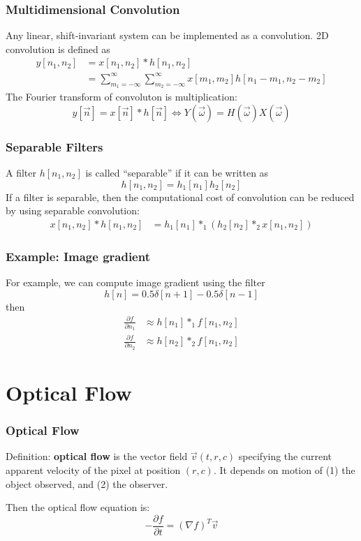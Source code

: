 \documentclass{beamer}
\begin{document}
\begin{frame}
  \frametitle{Multidimensional Convolution}

  Any linear, shift-invariant system can be implemented as a
  convolution.  2D convolution is defined as
  \begin{align*}
    y[n_1,n_2] &= x[n_1,n_2]\ast h[n_1,n_2]\\
    &= \sum_{m_1=-\infty}^\infty\sum_{m_2=-\infty}^\infty x[m_1,m_2]h[n_1-m_1,n_2-m_2]
  \end{align*}
  The Fourier transform of convoluton is multiplication:
  \[
  y[\vec{n}]=x[\vec{n}]\ast h[\vec{n}] \Leftrightarrow Y(\vec\omega)=H(\vec\omega)X(\vec\omega)
  \]
\end{frame}

\begin{frame}
  \frametitle{Separable Filters}
  A filter $h[n_1,n_2]$ is called ``separable'' if it can be written as
  \[
  h[n_1,n_2] = h_1[n_1]h_2[n_2]
  \]
  If a filter is separable, then the computational cost of convolution can be reduced
  by using separable convolution:
  \begin{align*}
    x[n_1,n_2]\ast h[n_1,n_2]
    &= h_1[n_1] \ast_1 \left(h_2[n_2]\ast_2 x[n_1,n_2]\right)
  \end{align*}
  
\end{frame}


\begin{frame}
  \frametitle{Example: Image gradient}

  For example, we can compute image gradient using the filter
  \[
  h[n] = 0.5\delta[n+1] - 0.5\delta[n-1]
  \]
  then
  \begin{align*}
  \frac{\partial f}{\partial n_1} &\approx h[n_1]\ast_1 f[n_1,n_2]\\
  \frac{\partial f}{\partial n_2} &\approx h[n_2]\ast_2 f[n_1,n_2]
  \end{align*}

\end{frame}

\section[Flow]{Optical Flow}
\setcounter{subsection}{1}

\begin{frame}
  \frametitle{Optical Flow}

  Definition: {\bf optical flow} is the vector field $\vec{v}(t,r,c)$
  specifying the current apparent velocity of the pixel at position
  $(r,c)$.  It depends on motion of (1) the object observed, and (2)
  the observer.
  
  Then the optical flow equation is:
  \[
  -\frac{\partial f}{\partial t} =(\nabla f)^T\vec{v}
  \]
\end{frame}
\end{document}
